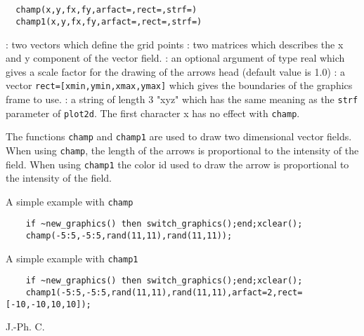 \begin{mandesc}
  \\ %
  \\ %
\end{mandesc}
\begin{calling_sequence}
\begin{verbatim}
  champ(x,y,fx,fy,arfact=,rect=,strf=)
  champ1(x,y,fx,fy,arfact=,rect=,strf=)
\end{verbatim}
\end{calling_sequence}
\begin{parameters}
  \begin{varlist}
    : two vectors which define the grid points
    : two matrices which describes the x and y component of the vector field.
    : an optional argument of type real which gives a scale factor
    for the drawing of the arrows head (default value is 1.0)
    : a vector \verb!rect=[xmin,ymin,xmax,ymax]! which gives
    the boundaries of the graphics frame to use.
    : a string of length 3 "xyz" which has the same meaning as the
    \verb!strf! parameter of \verb!plot2d!. The first
    character x has no effect with \verb!champ!.
  \end{varlist}
\end{parameters}

\begin{mandescription}
  The functions \verb!champ! and \verb!champ1! are used to draw two dimensional
  vector fields. When using \verb!champ!, the length of the arrows is proportional to the intensity of the field.
  When using \verb!champ1! the color id used to draw the arrow is proportional to the intensity of the field.
\end{mandescription}
\begin{examples}
  \noindent A simple example with \verb!champ!
  \begin{Verbatim}
    if ~new_graphics() then switch_graphics();end;xclear();
    champ(-5:5,-5:5,rand(11,11),rand(11,11));
  \end{Verbatim}
  \noindent A simple example with \verb!champ1!
  \begin{Verbatim}
    if ~new_graphics() then switch_graphics();end;xclear();
    champ1(-5:5,-5:5,rand(11,11),rand(11,11),arfact=2,rect=[-10,-10,10,10]);
  \end{Verbatim}
\end{examples}
\begin{authors}
  J.-Ph. C.
\end{authors}
